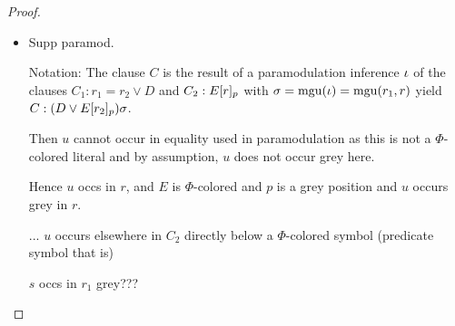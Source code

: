 \documentclass[,%
	draft=false,%
	numbers=noendperiod
	12pt,
	a4paper,
	oneside,%
	openany,
]{memoir}
\begin{document}
\begin{proof}
\begin{itemize}
{\begin{itemize}
\begin{itemize}
\begin{itemize}
										Hence other res fac lit contains $s$ grey, hence IH. 

									\item Supp paramod.

										Notation:
										The clause $C$ is the result of a paramodulation inference\nolinebreak{} $\iota$ of
										the clauses $C_1: r_1=r_2 \lor D$ and $C_2: E{[r]_{p}}$ with $\sigma=\operatorname{mgu}(\iota)=\operatorname{mgu}(r_1, r)$ yield $C: (D\lor E{[r_2]_{p}})\sigma$.

										Then  $u$ cannot occur in equality used in paramodulation as this is not a $\Phi$-colored literal and by assumption, $u$ does not occur grey here.

										Hence $u$ occs in $r$, and $E$ is $\Phi$-colored and $p$ is a grey position and $u$ occurs grey in $r$.

										... $u$ occurs elsewhere in $C_2$ directly below a $\Phi$-colored symbol (predicate symbol that is)

										$s$ occs in $r_1$ grey???



								\end{itemize}
						\end{itemize}
				\end{itemize}
			}
	\end{itemize}




\end{proof}
\end{document}
